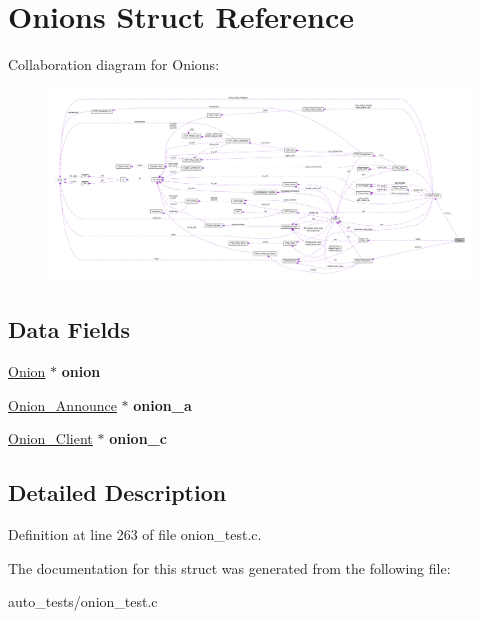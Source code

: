 \hypertarget{struct_onions}{\section{Onions Struct Reference}
\label{struct_onions}
}


Collaboration diagram for Onions\+:
\nopagebreak
\begin{figure}[H]
\begin{center}
\leavevmode
\includegraphics[width=350pt]{struct_onions__coll__graph}
\end{center}
\end{figure}
\subsection*{Data Fields}
\begin{DoxyCompactItemize}
\item 
\hypertarget{struct_onions_a66fb4bf67c711a5ed3e7bbecec7fde30}{\hyperlink{struct_onion}{Onion} $\ast$ {\bfseries onion}}\label{struct_onions_a66fb4bf67c711a5ed3e7bbecec7fde30}

\item 
\hypertarget{struct_onions_a3a345721fb6be385f4b4519679a4609f}{\hyperlink{struct_onion___announce}{Onion\+\_\+\+Announce} $\ast$ {\bfseries onion\+\_\+a}}\label{struct_onions_a3a345721fb6be385f4b4519679a4609f}

\item 
\hypertarget{struct_onions_ae202b81f9a2c2fa80fd310a0996795fc}{\hyperlink{struct_onion___client}{Onion\+\_\+\+Client} $\ast$ {\bfseries onion\+\_\+c}}\label{struct_onions_ae202b81f9a2c2fa80fd310a0996795fc}

\end{DoxyCompactItemize}


\subsection{Detailed Description}


Definition at line 263 of file onion\+\_\+test.\+c.



The documentation for this struct was generated from the following file\+:\begin{DoxyCompactItemize}
\item 
auto\+\_\+tests/onion\+\_\+test.\+c\end{DoxyCompactItemize}
